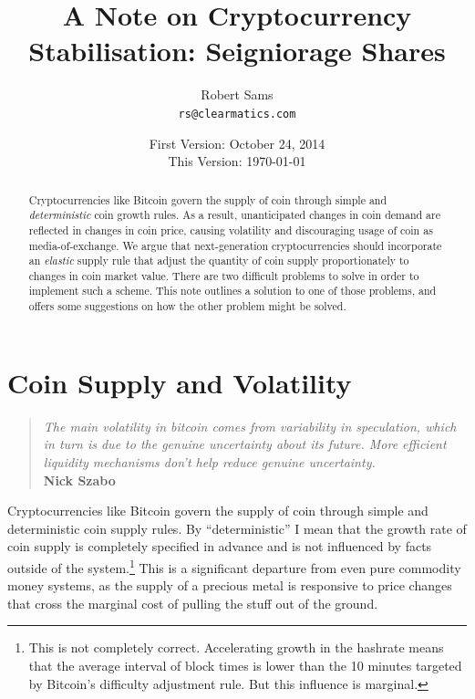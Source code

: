 \documentclass[twocolumn]{article}
\begin{document}
\onecolumn
\title{A Note on Cryptocurrency Stabilisation: Seigniorage Shares}
\usdate %
\date{First Version: October 24, 2014\\This Version: \today{}}
\author{Robert Sams\\\texttt{rs@clearmatics.com}}
\maketitle
\begin{abstract}
  Cryptocurrencies like Bitcoin govern the supply of coin through
  simple and \emph{deterministic} coin growth rules. As a result,
  unanticipated changes in coin demand are reflected in changes in
  coin price, causing volatility and discouraging usage of coin as
  media-of-exchange. We argue that next-generation cryptocurrencies
  should incorporate an \emph{elastic} supply rule that adjust the
  quantity of coin supply proportionately to changes in coin market
  value. There are two difficult problems to solve in order to
  implement such a scheme. This note outlines a solution to one of
  those problems, and offers some suggestions on how the other problem
  might be solved.
\end{abstract}
\titlepage


\twocolumn
\section*{Coin Supply and Volatility}
\begin{quote}
\textit{The main volatility in bitcoin comes from variability in
speculation, which in turn is due to the genuine uncertainty about its
future. More efficient liquidity mechanisms don't help reduce genuine
uncertainty.\cite{szabo}}\\\textbf{Nick Szabo}
\end{quote}
Cryptocurrencies like Bitcoin govern the supply of coin through simple
and deterministic coin supply rules. By ``deterministic'' I mean that
the growth rate of coin supply is completely specified in advance and
is not influenced by facts outside of the system.\footnote{This is not
  completely correct. Accelerating growth in the hashrate means that
  the average interval of block times is lower than the 10 minutes
  targeted by Bitcoin's difficulty adjustment rule. But this
  influence is marginal.} This is a significant departure from even
pure commodity money systems, as the supply of a precious metal is
responsive to price changes that cross the marginal cost of pulling
the stuff out of the ground.
\end{document}
